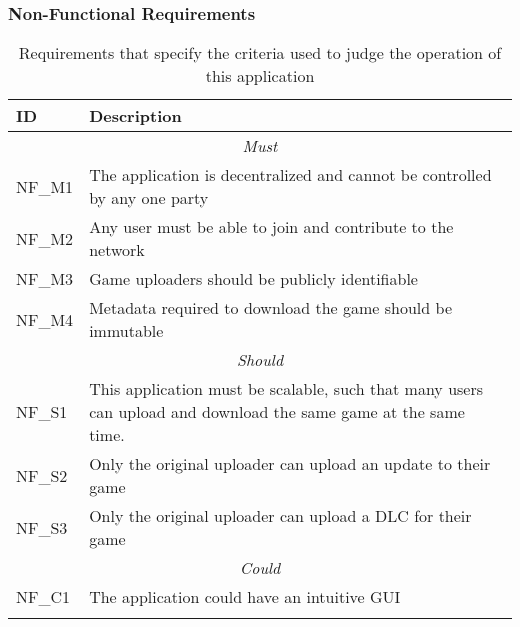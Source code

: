 \subsubsection*{Non-Functional Requirements}
\tbd

\begin{longtable}{ p{} p{} }
  \toprule
  \textbf{ID} & \textbf{Description}
  \\\midrule\midrule
  \multicolumn{2}{c}{\cellcolor{red!70}\textit{Must}}\\\midrule
  NF\_M1 & The application is decentralized and cannot be controlled by any one party\\
  NF\_M2 & Any user must be able to join and contribute to the network\\
  NF\_M3 & Game uploaders should be publicly identifiable\\
  NF\_M4 & Metadata required to download the game should be immutable\\
  \midrule\multicolumn{2}{c}{\cellcolor{orange!70}\textit{Should}}\\\midrule
  NF\_S1 & This application must be scalable, such that many users can upload and download the same game at the same time.\\
  NF\_S2 & Only the original uploader can upload an update to their game\\
  NF\_S3 & Only the original uploader can upload a DLC for their game\\
  \midrule\multicolumn{2}{c}{\cellcolor{green}\textit{Could}}\\\midrule
  NF\_C1 & The application could have an intuitive GUI\\
  \midrule
  \bottomrule
  \caption{Requirements that specify the criteria used to judge the operation of this application}
  \label{tab:non-functional-requirements}
\end{longtable}